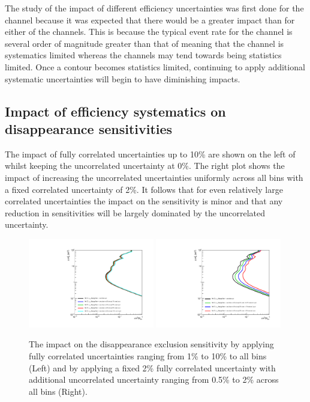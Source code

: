 The study of the impact of different efficiency uncertainties was first done for the \numu channel because it was expected that there would be a greater impact than for either of the \nue channels. This is because the typical event rate for the \numu channel is several order of magnitude greater than that of \nue meaning that the \numu channel is systematics limited whereas the \nue channels may tend towards being statistics limited. Once a contour becomes statistics limited, continuing to apply additional systematic uncertainties will begin to have diminishing impacts. 

\subsection{\texorpdfstring{Impact of efficiency systematics on \numu disappearance sensitivities}{Impact of efficiency systematics on numu disappearance sensitivities}}


The impact of fully correlated uncertainties up to 10\% are shown on the left of  whilst keeping the uncorrelated uncertainty at 0\%. The right plot shows the impact of increasing the uncorrelated uncertainties uniformly across all bins with a fixed correlated uncertainty of 2\%. It follows that for even relatively large correlated uncertainties the impact on the sensitivity is minor and that any reduction in sensitivities will be largely dominated by the uncorrelated uncertainty. 

\begin{figure}[!h]
    \centering
    \includegraphics[width = 0.49\textwidth]{figures-chap6/exclusion_contours/efficiency_systematics/numu_disapp_Xpct_cor.pdf}
    \includegraphics[width = 0.49\textwidth]{figures-chap6/exclusion_contours/efficiency_systematics/numu_disapp_2pct_cor_Xpct_uncor.pdf}
    \caption[Impact of correlated and uncorrelated efficiency systematics on the \numu disappearance channel.]{The impact on the \numu disappearance exclusion sensitivity by applying fully correlated uncertainties ranging from 1\% to 10\% to all bins (Left) and by applying a fixed 2\% fully correlated uncertainty with additional uncorrelated uncertainty ranging from 0.5\% to 2\% across all bins (Right). }
    \label{fig:numu_corr_uncorr_error}
\end{figure}

